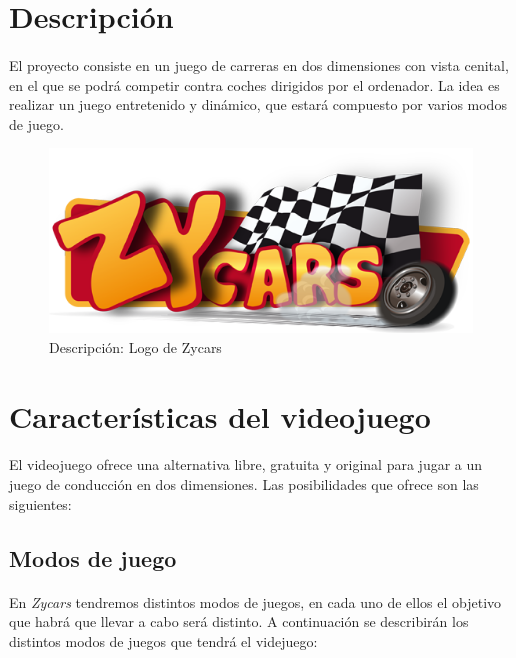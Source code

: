 
\section{Descripción}

\paragraph{}
El proyecto consiste en un juego de carreras en dos dimensiones con vista cenital, en el que se podrá competir contra 
coches dirigidos por el ordenador. La idea es realizar un juego entretenido y dinámico, que estará compuesto por varios modos de juego.

\begin{figure}[H]
  \label{logo_zycars}
  \begin{center}
    \includegraphics[scale=0.5]{imagenes/logo_zycars.png}
  \end{center}
  \caption{Descripción: Logo de Zycars}
\end{figure}

\section{Características del videojuego}

\paragraph{}
El videojuego ofrece una alternativa libre, gratuita y original para jugar a un juego de conducción en dos dimensiones. 
Las posibilidades que ofrece son las siguientes:

\subsection{Modos de juego}

\paragraph{}
En \emph{Zycars} tendremos distintos modos de juegos, en cada uno de ellos el
objetivo que habrá que llevar a cabo será distinto.
A continuación se describirán los distintos modos de juegos que tendrá el videjuego:

